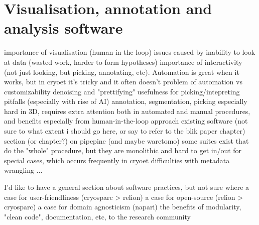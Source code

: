 \chapter{Visualisation, annotation and analysis software}

\begin{outline}
\1 importance of visualisation (human-in-the-loop)
    \2 issues caused by inability to look at data (wasted work, harder to form hypotheses)
    \2 importance of interactivity (not just looking, but picking, annotating, etc). Automation is great when it works, but in cryoet it's tricky and it often doesn't
        \3 problem of automation vs customizability
\1 denoising and "prettifying"
    \2 usefulness for picking/intepreting
    \2 pitfalls (especially with rise of AI)
\1 annotation, segmentation, picking
    \2 especially hard in 3D, requires extra attention both in automated and manual procedures, and benefits especially from human-in-the-loop approach
    \2 existing software (not sure to what extent i should go here, or say to refer to the blik paper chapter)
\1 section (or chapter?) on pipepine (and maybe waretomo)
    \2 some suites exist that do the "whole" procedure, but they are monolithic and hard to get in/out for special cases, which occurs frequently in cryoet
    \2 difficulties with metadata wrangling
    \2 ...

\1 I'd like to have a general section about software practices, but not sure where
    \1 a case for user-friendliness (cryosparc > relion)
    \1 a case for open-source (relion > cryosparc)
    \1 a case for domain agnosticism (napari)
    \1 the benefits of modularity, "clean code", documentation, etc, to the research community

\end{outline}
